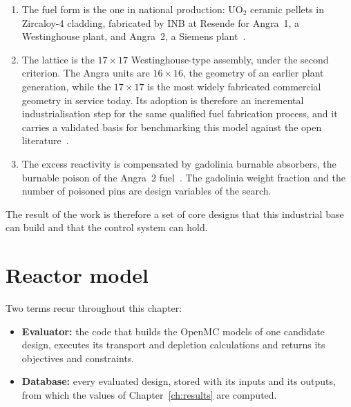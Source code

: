 \begin{enumerate}
  \item The fuel form is the one in national production: UO$_2$
        ceramic pellets in Zircaloy-4 cladding, fabricated by INB at
        Resende for Angra~1, a Westinghouse plant, and Angra~2, a
        Siemens
        plant~\cite{inb_montagem_ec,eletronuclear_angra1,eletronuclear_angra2}.

  \item The lattice is the $17\times17$ Westinghouse-type assembly,
        under the second criterion. The Angra units are $16\times16$,
        the geometry of an earlier plant generation, while the
        $17\times17$ is the most widely fabricated commercial geometry
        in service today. Its adoption is therefore an incremental
        industrialisation step for the same qualified fuel fabrication
        process, and it carries a validated basis for benchmarking this
        model against the open
        literature~\cite{nuscale_htp2_2017,nuscale_like_core_2024}.

  \item The excess reactivity is compensated by gadolinia burnable
        absorbers, the burnable poison of the Angra~2
        fuel~\cite{angra2_gd_2018}. The gadolinia weight fraction and
        the number of poisoned pins are design variables of the
        search.
\end{enumerate}

The result of the work is therefore a set of core designs that this
industrial base can build and that the control system can hold.

\section{Reactor model}
\label{sec:reactor-model}

Two terms recur throughout this chapter:

\begin{itemize}
  \item \textbf{Evaluator:} the code that builds the OpenMC models of
        one candidate design, executes its transport and depletion
        calculations and returns its objectives and constraints.
  \item \textbf{Database:} every evaluated design, stored with its
        inputs and its outputs, from which the values of
        Chapter~\ref{ch:results} are computed.
\end{itemize}

